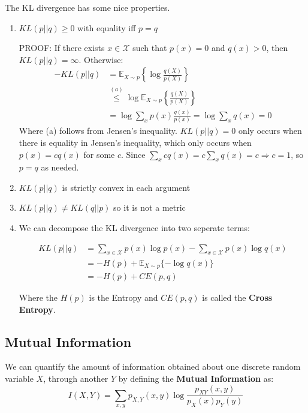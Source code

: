 \documentclass[]{article}
\theoremstyle{mattstyle}
\theoremstyle{definition}
\begin{document}
The KL divergence has some nice properties.
\begin{enumerate}
	\item $KL(p||q) \ge 0$ with equality iff $p=q$
	
	PROOF: If there exists $x \in \mathcal{X}$ such that $p(x) = 0$ and $q(x) > 0$, then $KL(p || q) = \infty$.	Otherwise:
	\begin{align*}
	-KL(p||q) &= \mathbb{E}_{X\sim p}\left\{\log \frac{q(X)}{p(X)}\right\}\\
	&\overset{(a)}{\le} \log \mathbb{E}_{X\sim p}\left\{\frac{q(X)}{p(X)}\right\} \\
	&= \log \sum_{x} p(x)\frac{q(x)}{p(x)} = \log \sum_{x} q(x) = 0
	\end{align*}
	Where (a) follows from Jensen's inequality. $KL(p||q) = 0$ only occurs when there is equality in Jensen's inequality, which only occurs when $p(x)=cq(x)$ for some $c$. Since $\sum_{x}cq(x) = c\sum_{x}q(x) = c \Rightarrow c=1$, so $p=q$ as needed.
	
	\item $KL(p||q)$ is strictly convex in each argument
	
	\item $KL(p||q) \ne KL(q||p)$ so it is not a metric
	
	\item We can decompose the KL divergence into two seperate terms:
	
	\begin{align} KL(p||q) &= \sum_{x\in\mathcal{X}}p(x)\log p(x) - \sum_{x\in\mathcal{X}}p(x)\log q(x) \\
	&= -H(p) + \mathbb{E}_{X\sim p}\{-\log q(x)\} \\
	&= -H(p) + CE(p,q)
	\end{align}
	
	Where the $H(p)$ is the Entropy and $CE(p,q)$ is called the \textbf{Cross Entropy}.
	
\end{enumerate}

\subsection{Mutual Information}
We can quantify the amount of information obtained about one discrete random variable $X$, through another $Y$ by defining the \textbf{Mutual Information} as:
\begin{equation}
I(X,Y)=\sum_{x,y}p_{X,Y}(x,y)\log\frac{p_{XY}(x,y)}{p_X(x)p_Y(y)}
\end{equation}
\end{document}
